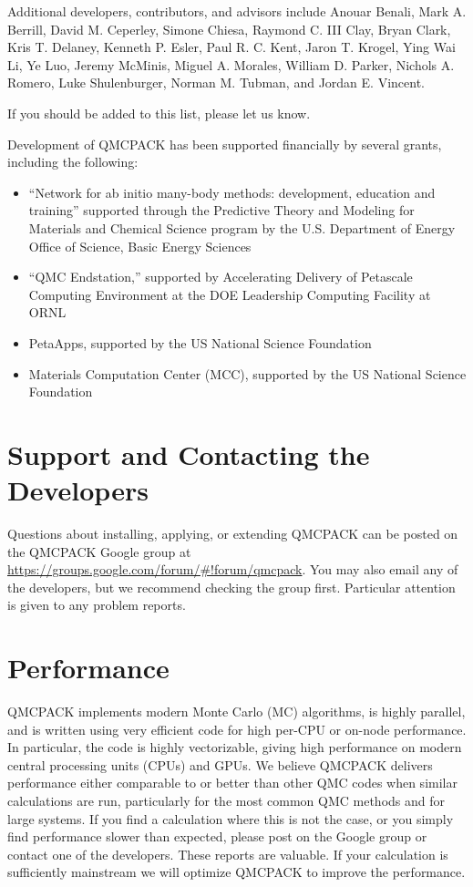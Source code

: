 Additional developers, contributors, and advisors include
Anouar Benali,
Mark A. Berrill,  
David M. Ceperley, 
Simone Chiesa,
Raymond C. III Clay,
Bryan Clark,
Kris T. Delaney,
Kenneth P. Esler,
Paul R. C. Kent,
Jaron T. Krogel,
Ying Wai Li,
Ye Luo,
Jeremy McMinis,
Miguel A. Morales,
William D. Parker,
Nichols A. Romero,
Luke Shulenburger,
Norman M. Tubman,
and Jordan E. Vincent.

If you should be added to this list, please let us know.

Development of QMCPACK has been supported financially by
several grants, including the following:

\begin{itemize}
\item ``Network for ab initio many-body methods: development, education
  and training'' supported through the Predictive
  Theory and Modeling for Materials and Chemical Science program by
  the U.S. Department of Energy Office of Science, Basic Energy
  Sciences
\item ``QMC Endstation,'' supported by Accelerating Delivery of Petascale
  Computing Environment at the DOE Leadership Computing Facility at
  ORNL
\item PetaApps, supported by the US National Science
  Foundation
\item Materials Computation Center (MCC), supported by the
  US National Science Foundation
\end{itemize}


\section{Support and Contacting the Developers}
\label{sec:support}

Questions about installing, applying, or extending QMCPACK can be
posted on the QMCPACK Google group at
\url{https://groups.google.com/forum/#!forum/qmcpack}. You may also
email any of the developers, but we recommend checking the group
first. Particular attention is given to any problem reports.

\section{Performance}
\label{sec:performance}

QMCPACK implements modern Monte Carlo (MC) algorithms, is highly parallel,
and is written using very efficient code for high per-CPU or on-node performance. In particular, the code is highly vectorizable,
giving high performance on modern central processing units (CPUs) and GPUs. We believe QMCPACK
delivers performance either comparable to or better than other QMC
codes when similar calculations are run, particularly for the most
common QMC methods and for large systems. If you find a calculation where this is not the
case, or you simply find performance slower than expected, please post on the Google
group or contact one of the developers. These reports are valuable. If your calculation is
sufficiently mainstream we will optimize QMCPACK to improve
the performance.

